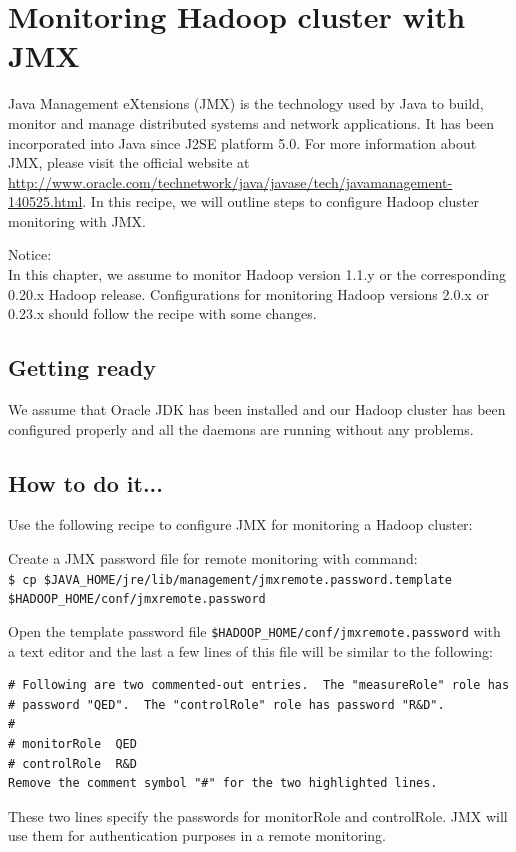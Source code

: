 \section{Monitoring Hadoop cluster with JMX}
Java Management eXtensions (JMX) is the technology used by Java to build, monitor and manage distributed systems and network applications. It has been incorporated into Java since J2SE platform 5.0. For more information about JMX, please visit the official website at \url{http://www.oracle.com/technetwork/java/javase/tech/javamanagement-140525.html}. In this recipe, we will outline steps to configure Hadoop cluster monitoring with JMX.
\begin{info}
Notice: \\
In this chapter, we assume to monitor Hadoop version 1.1.y or the corresponding 0.20.x Hadoop release. Configurations for monitoring Hadoop versions 2.0.x or 0.23.x should follow the recipe with some changes.
\end{info}

\subsection*{Getting ready}
We assume that Oracle JDK has been installed and our Hadoop cluster has been configured properly and all the daemons are running without any problems.

\subsection*{How to do it...}
 Use the following recipe to configure JMX for monitoring a Hadoop cluster:

Create a JMX password file for remote monitoring with command: \\
\verb|$ cp $JAVA_HOME/jre/lib/management/jmxremote.password.template $HADOOP_HOME/conf/jmxremote.password|

Open the template password file \verb|$HADOOP_HOME/conf/jmxremote.password| with a text editor and the last a few lines of this file will be similar to the following: 
\begin{verbatim}
# Following are two commented-out entries.  The "measureRole" role has
# password "QED".  The "controlRole" role has password "R&D".
#
# monitorRole  QED
# controlRole  R&D
Remove the comment symbol "#" for the two highlighted lines.
\end{verbatim}

These two lines specify the passwords for monitorRole and controlRole. JMX will use them for authentication purposes in a remote monitoring.

